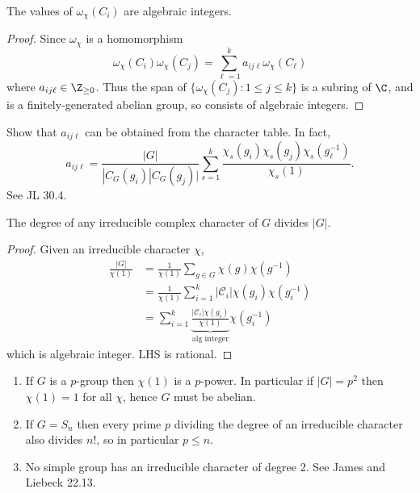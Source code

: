 \documentclass[a4paper]{article}
\newcommand{\ccl}{{\mathcal C}} %
\theoremstyle{definition}
\begin{document}
\begin{lemma}
  The values of \(\omega_\chi(C_i)\) are algebraic integers.
\end{lemma}

\begin{proof}
  Since \(\omega_\chi\) is a homomorphism
  \[
    \omega_\chi(C_i) \omega_\chi(C_j) = \sum_{\ell = 1}^k a_{ij\ell} \omega_\chi (C_\ell)
  \]
  where \(a_{ij\ell} \in \Z_{\geq 0}\). Thus the span of \(\{\omega_\chi(C_j): 1 \leq j \leq k\}\) is a subring of \(\C\), and is a finitely-generated abelian group, so consists of algebraic integers.
\end{proof}

\begin{ex}
  Show that \(a_{ij\ell}\) can be obtained from the character table. In fact,
  \[
    a_{ij\ell} = \frac{|G|}{|C_G(g_i) |C_G(g_j)|} \sum_{s = 1}^k \frac{\chi_s(g_i) \chi_s(g_j) \chi_s(g_\ell^{-1})}{\chi_s(1)}.
  \]
  See JL 30.4.
\end{ex}

\begin{theorem}
  The degree of any irreducible complex character of \(G\) divides \(|G|\).
\end{theorem}

\begin{proof}
  Given an irreducible character \(\chi\),
  \begin{align*}
    \frac{|G|}{\chi(1)}
    &= \frac{1}{\chi(1)} \sum_{g \in G} \chi(g) \chi(g^{-1}) \\
    &= \frac{1}{\chi(1)} \sum_{i = 1}^k |\ccl_i| \chi(g_i) \chi(g_i^{-1}) \\
    &= \sum_{i = 1}^k \underbrace{\frac{|\ccl_i| \chi(g_i)}{\chi(1)}}_{\text{alg integer}} \chi(g_i^{-1})
  \end{align*}
  which is algebraic integer. LHS is rational.
\end{proof}

\begin{eg}\leavevmode
  \begin{enumerate}
  \item If \(G\) is a \(p\)-group then \(\chi(1)\) is a \(p\)-power. In particular if \(|G| = p^2\) then \(\chi(1) = 1\) for all \(\chi\), hence \(G\) must be abelian.
  \item If \(G = S_n\) then every prime \(p\) dividing the degree of an irreducible character also divides \(n!\), so in particular \(p \leq n\).
  \item No simple group has an irreducible character of degree 2. See James and Liebeck 22.13.
  \end{enumerate}
\end{eg}
\end{document}
